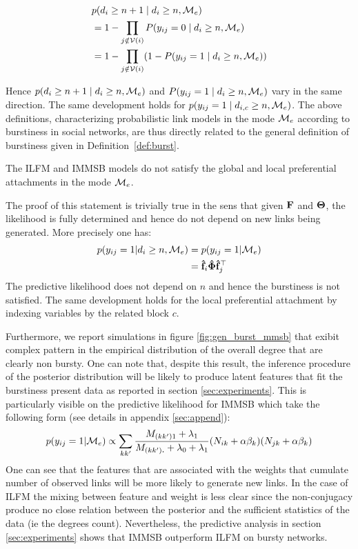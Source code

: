 \begin{align}
&p(d_{i} \ge n+1 \mid d_i \ge n, \mathcal{M}_e) \nonumber \\
&= 1 - \prod_{j \notin \mathcal{V}(i)} P(y_{ij} = 0 \mid d_i \ge n, \mathcal{M}_e) \nonumber \\
&= 1 - \prod_{j \notin \mathcal{V}(i)} (1 - P(y_{ij} = 1 \mid d_i \ge n, \mathcal{M}_e)) \nonumber
\end{align}


Hence $p(d_{i} \ge n+1 \mid d_i \ge n, \mathcal{M}_e)$ and $P(y_{ij} = 1 \mid d_i \ge n, \mathcal{M}_e)$ vary in the same direction. The same development holds for $p(y_{ij}=1 \mid d_{i,c} \ge n, \mathcal{M}_e)$. The above definitions, characterizing probabilistic link models in the mode $\mathcal{M}_e$ according to burstiness in social networks, are thus directly related to the general definition of burstiness given in Definition~\ref{def:burst}.


\begin{proposition}
	The ILFM and IMMSB models do not satisfy the global and local preferential attachments in the mode $\mathcal{M}_e$.
\end{proposition}

The proof of this statement is trivially true in the sens that given $\mathbf{F}$ and $\mathbf{\Theta}$, the likelihood is fully determined and hence do not depend on new links being generated. More precisely one has:
\begin{align}
p(y_{ij}=1| d_i \ge n, \mathcal{M}_e) &= p(y_{ij}=1| \mathcal{M}_e)\\
&= \mathbf{\hat{f}}_{i} \mathbf{\hat{\Phi}} \mathbf{\hat{f}}_j^\top
\end{align}
The predictive likelihood does not depend on $n$ and hence the burstiness is not satisfied. The same development holds for the local preferential attachment by indexing variables by the related block $c$.

Furthermore, we report simulations in figure \ref{fig:gen_burst_mmsb} that exibit complex pattern in the empirical distribution of the overall degree that are clearly non bursty. One can note that, despite this result, the inference procedure of the posterior distribution will be likely to produce latent features that fit  the burstiness present data as reported in section \ref{sec:experiments}. This is particularly visible on the predictive likelihood for IMMSB which take the following form (see details in appendix \ref{sec:append}):
\begin{equation} \label{eq:ppp}
p(y_{ij}=1 | \M_e)\propto \sum_{kk'} \frac{M_{(kk')1} + \lambda_1}{M_{(kk')\bm{.}} + \lambda_0 + \lambda_1}  (N_{ik} + \alpha\beta_k ) (N_{jk} + \alpha\beta_k)
\end{equation}   
One can see that the features that are associated with the weights that cumulate number of observed links will be more likely to generate new links. In the case of ILFM the mixing between feature and weight is less clear since the non-conjugacy produce no close relation between the posterior and the sufficient statistics of the data (ie the degrees count). Nevertheless, the predictive analysis in section \ref{sec:experiments} shows that IMMSB outperform ILFM on bursty networks.


